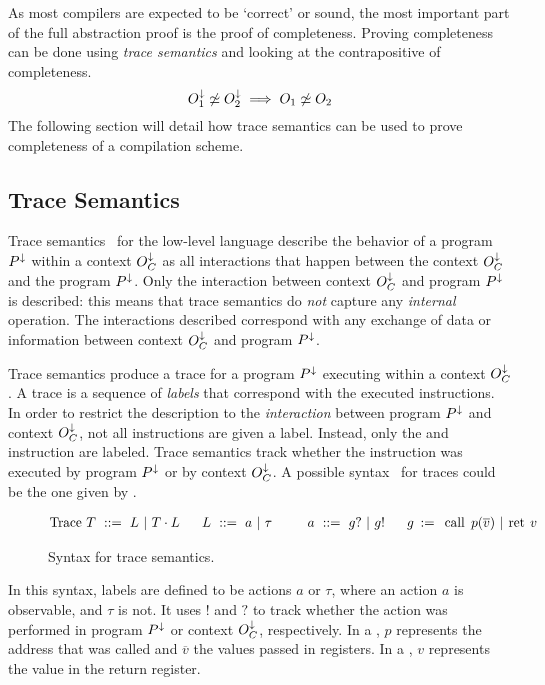 As most compilers are expected to be `correct' or sound, the most important part of the full abstraction proof is the proof of completeness.
Proving completeness can be done using \emph{trace semantics} and looking at the contrapositive of completeness.
\[
    O_{1}^{\downarrow} \not\simeq O_{2}^{\downarrow} \implies O_{1} \not\simeq O_{2}
\]
The following section will detail how trace semantics can be used to prove completeness of a compilation scheme.

\subsection{Trace Semantics}
\label{sec:tracesemantics}
Trace semantics~\cite{Rathke, Patrignani:TraceSemantics} for the low-level language describe the behavior of a program $P^{\downarrow}$ within a context $O_C^{\downarrow}$ as all interactions that happen between the context $O_C^{\downarrow}$ and the program $P^{\downarrow}$.
Only the interaction between context $O_C^{\downarrow}$ and program $P^{\downarrow}$ is described: this means that trace semantics do \emph{not} capture any \emph{internal} operation.
The interactions described correspond with any exchange of data or information between context $O_C^{\downarrow}$ and program $P^{\downarrow}$.

Trace semantics produce a trace for a program $P^{\downarrow}$ executing within a context $O_C^{\downarrow}$.
A trace is a sequence of \emph{labels} that correspond with the executed instructions.
In order to restrict the description to the \emph{interaction} between program $P^{\downarrow}$ and context $O_C^{\downarrow}$, not all instructions are given a label.
Instead, only the  and  instruction are labeled.
Trace semantics track whether the instruction was executed by program $P^{\downarrow}$ or by context $O_C^{\downarrow}$.
A possible syntax~\cite{Patrignani:TraceSemantics} for traces could be the one given by .
\newcommand{\fs}{\;\;\;}
\vspace{-1.5em}
{\setlength{\abovecaptionskip}{0pt}
\begin{figure}[H]
\begin{align*}
\begin{aligned}
\text{Trace\ } T\ ::=\ L\ |\ T\cdot L \fs & \fs L\ ::=\ a\ |\ \tau \fs & \fs a\ ::=\ g?\ |\ g! \fs & \fs g \::=\ \kw{call}\ p(\overline{v})\ |\ \kw{ret}\ v
\end{aligned}
\end{align*}
\caption{Syntax for trace semantics\label{fig:tracesemanticssyntax}.}
\end{figure}
}
\vspace{-1em}
In this syntax, labels are defined to be actions $a$ or $\tau$, where an action $a$ is observable, and $\tau$ is not.
It uses $!$ and $?$ to track whether the action was performed in program $P^{\downarrow}$ or context $O_C^{\downarrow}$, respectively.
In a , $p$ represents the address that was called and $\overline{v}$ the values passed in registers.
In a , $v$ represents the value in the return register.

